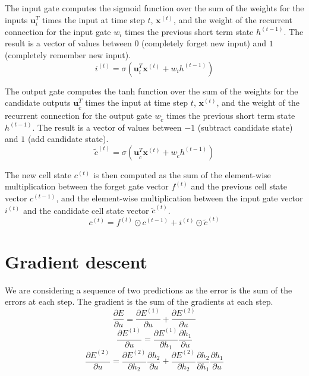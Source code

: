 \documentclass[a4paper]{article}
\begin{document}
The input gate computes the sigmoid function over the sum of the weights for the inputs $\mathbf{u}^T_i$ times the input at time step $t$, $\mathbf{x}^{(t)}$, and the weight of the recurrent connection for the input gate $w_i$ times the previous short term state $h^{(t-1)}$. The result is a vector of values between $0$ (completely forget new input) and $1$ (completely remember new input).
\begin{equation}
    i^{(t)} = \sigma(\mathbf{u}^T_i\mathbf{x}^{(t)}+w_ih^{(t-1)})
\end{equation}

The output gate computes the tanh function over the sum of the weights for the candidate outputs $\mathbf{u}^T_{\tilde{c}}$ times the input at time step $t$, $\mathbf{x}^{(t)}$, and the weight of the recurrent connection for the output gate $w_{\tilde{c}}$ times the previous short term state $h^{(t-1)}$. The result is a vector of values between $-1$ (subtract candidate state) and $1$ (add candidate state).
\begin{equation}
    \tilde{c}^{(t)} = \sigma(\mathbf{u}^T_{\tilde{c}}\mathbf{x}^{(t)}+w_{\tilde{c}}h^{(t-1)})
\end{equation}

The new cell state $c^{(t)}$ is then computed as the sum of the element-wise multiplication between the forget gate vector $f^{(t)}$ and the previous cell state vector $c^{(t-1)}$, and the element-wise multiplication between the input gate vector $i^{(t)}$ and the candidate cell state vector $\tilde{c}^{(t)}$.
\begin{equation}
    c^{(t)} = f^{(t)}\odot c^{(t-1)}+i^{(t)}\odot\tilde{c}^{(t)}
\end{equation}

\section{Gradient descent} %
We are considering a sequence of two predictions as the error is the sum of the errors at each step. The gradient is the sum of the gradients at each step.
\begin{equation}
    \frac{\partial E}{\partial u} = \frac{\partial E^{(1)}}{\partial u} + \frac{\partial E^{(2)}}{\partial u}
\end{equation}
\begin{equation}
    \frac{\partial E^{(1)}}{\partial u} = \frac{\partial E^{(1)}}{\partial h_1} \frac{\partial h_1}{\partial u}
\end{equation}
\begin{equation}
    \frac{\partial E^{(2)}}{\partial u} = \frac{\partial E^{(2)}}{\partial h_2} \frac{\partial h_2}{\partial u} + \frac{\partial E^{(2)}}{\partial h_2} \frac{\partial h_2}{\partial h_1} \frac{\partial h_1}{\partial u} 
\end{equation}
\end{document}
